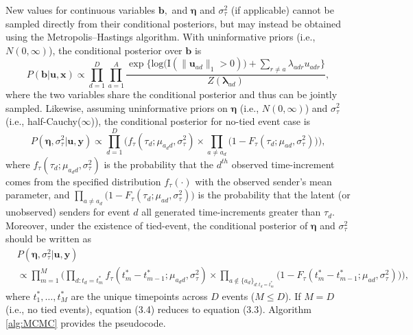 \documentclass[ba]{imsart}
\numberwithin{equation}{section}
\theoremstyle{plain}
\begin{document}
New values for continuous variables $\boldsymbol{b},$ and $\boldsymbol{\eta}$ and $\sigma^2_\tau$ (if applicable) cannot be sampled directly from their conditional posteriors, but may instead be obtained using the Metropolis--Hastings algorithm. With uninformative priors (i.e., $N({0},\infty)$), the conditional posterior over $\boldsymbol{b}$ is
\begin{equation}
P(\boldsymbol{b}| \boldsymbol{u}, \boldsymbol{x})\propto \prod_{d=1}^D
\prod_{a=1}^A \frac{\exp\Big\{\mbox{log}\big(\text{I}( \lVert \boldsymbol{u}_{ad}\rVert_1 > 0)\big) + \sum\limits_{r \neq a} \lambda_{adr}u_{adr}\Big\}}{Z(\boldsymbol{\lambda}_{ad})},
\end{equation}
where the two variables share the conditional posterior and thus can be jointly sampled. Likewise, assuming uninformative priors on $\boldsymbol{\eta}$ (i.e., $N({0},\infty)$) and $\sigma_{\tau}^2$ (i.e., half-Cauchy($\infty$)), the conditional posterior for no-tied event case is
\begin{equation}
P(\boldsymbol{\eta}, \sigma_\tau^2| \boldsymbol{u}, \boldsymbol{y})\propto \prod_{d=1}^D\Big(f_{\tau}(\tau_{d}; \mu_{a_d d}, \sigma_\tau^2)\times \prod_{a\neq a_d}\big(1-F_{\tau}(\tau_{d}; \mu_{a d}, \sigma_\tau^2) \big)\Big),
\end{equation}
where $f_{\tau}(\tau_{d}; \mu_{a_d d}, \sigma_\tau^2)$ is the probability that the $d^{th}$ observed time-increment comes from the specified distribution $f_\tau(\cdot)$ with the observed sender's mean parameter, and $\prod_{a\neq a_d}\big(1-F_{\tau}(\tau_{d}; \mu_{a d}, \sigma_\tau^2) \big)$ is the probability that the latent (or unobserved) senders for event $d$ all generated time-increments greater than $\tau_d$. Moreover, under the existence of tied-event, the conditional posterior of $\boldsymbol{\eta}$ and $\sigma_{\tau}^2$ should be written as
\begin{equation}
\begin{aligned}
&P(\boldsymbol{\eta}, \sigma_\tau^2| \boldsymbol{u}, \boldsymbol{y})\\&\propto \prod_{m=1}^M\Big(\prod_{d:t_d=t_m^*}f_{\tau}(t_m^*-t_{m-1}^*; \mu_{a_d d}, \sigma_\tau^2) \times \prod_{a \notin \{a_d\}_{d:t_d=t_m^*}}\big(1-F_{\tau}(t_m^*-t_{m-1}^*; \mu_{a d}, \sigma_\tau^2) \big)\Big),
\end{aligned}
\end{equation}
where $t_1^*,\ldots,t_M^*$ are the unique timepoints across $D$ events ($M \leq D$). If $M=D$ (i.e., no tied events), equation (3.4) reduces to equation (3.3). Algorithm \ref{alg:MCMC} provides the pseudocode.
\end{document}
